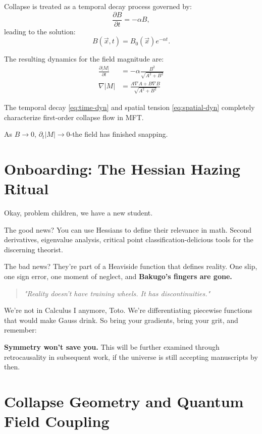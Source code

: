 Collapse is treated as a temporal decay process governed by:
\[
\frac{\partial B}{\partial t} = -\alpha B,
\]
leading to the solution:
\[
B(\vec{x}, t) = B_0(\vec{x}) e^{-\alpha t}.
\]

The resulting dynamics for the field magnitude are:
\begin{align}
  \frac{\partial |M|}{\partial t} &= -\alpha\frac{B^2}{\sqrt{A^2+B^2}} \label{eq:time-dyn}\\
  \nabla |M| &= \frac{A\nabla A + B\nabla B}{\sqrt{A^2+B^2}} \label{eq:spatial-dyn}
\end{align}

\begin{theorem}
  The temporal decay \eqref{eq:time-dyn} and spatial tension \eqref{eq:spatial-dyn} completely characterize first-order collapse flow in MFT.
\end{theorem}

As $B \to 0$, $\partial_t|M| \to 0$-the field has finished snapping.

\section*{Onboarding: The Hessian Hazing Ritual}

Okay, problem children, we have a new student.

The good news? You can use Hessians to define their relevance in math. Second derivatives, eigenvalue analysis, critical point classification-delicious tools for the discerning theorist.

The bad news? They're part of a Heaviside function that defines reality. One slip, one sign error, one moment of neglect, and \textbf{Bakugo's fingers are gone.}

\begin{quote}
\emph{"Reality doesn't have training wheels. It has discontinuities."}
\end{quote}

We're not in Calculus I anymore, Toto. We're differentiating piecewise functions that would make Gauss drink. So bring your gradients, bring your grit, and remember:

\textbf{Symmetry won't save you.} This will be further examined through retrocausality in subsequent work, if the universe is still accepting manuscripts by then.


\section{Collapse Geometry and Quantum Field Coupling}

